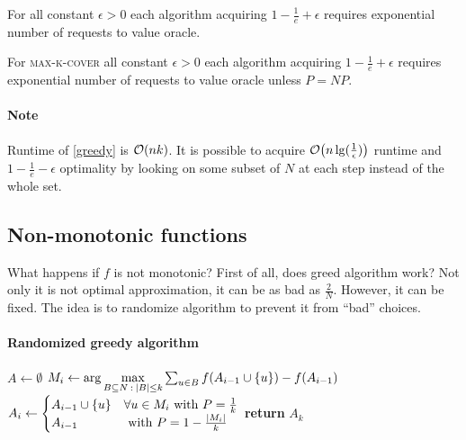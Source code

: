 \begin{theorem} 
	For all constant $\epsilon>0$ each algorithm acquiring $1-\frac{1}{e} + \epsilon$ requires exponential number of requests to value oracle.
\end{theorem}
\begin{theorem}
For \textsc{max-k-cover} all constant $\epsilon>0$ each algorithm acquiring $1-\frac{1}{e} + \epsilon$ requires exponential number of requests to value oracle unless $P=NP$.
\end{theorem}
\paragraph{Note} Runtime of \vref{greedy} is $\order{nk}$. It is possible to acquire $\order{n\lg(\frac{1}{\epsilon})}$ runtime and $1-\frac{1}{e}-\epsilon$ optimality by looking on some subset of $N$ at each step instead of the whole set. 
\subsection{Non-monotonic functions}
What happens if $f$ is not monotonic? First of all, does greed algorithm work? Not only it is not optimal approximation, it can be as bad as $\frac{2}{N}$. However, it can be fixed. The idea is to randomize algorithm to prevent it from ``bad'' choices.


\paragraph{Randomized greedy algorithm}
\begin{algorithm}
	\caption{}\label{rand_greedy}
	\begin{algorithmic}[1]
		\State $A \gets \emptyset$
		\State $ M_i \gets \arg\max\limits_{B\subseteq N \: : \: \abs{B} \leq k} \sum_{u\in B} f\qty(A_{i-1} \cup \qty{u} ) - f\qty(A_{i-1})$
		\State $ A_i \gets \begin{cases}
		A_{i-1} \cup \qty{u} & \forall u \in M_i \text{ with } P=\frac{1}{k}\\
		A_{i-1} & \text{ with } P=1-\frac{\abs{M_i}}{k}
		\end{cases} $
		\EndFor
		\State \textbf{return} $A_k$
		\EndProcedure
	\end{algorithmic}
\end{algorithm}

